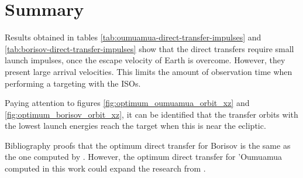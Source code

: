 \section{Summary}
\label{sec:direct-results}

Results obtained in tables \ref{tab:oumuamua-direct-transfer-impulses} and
\ref{tab:borisov-direct-transfer-impulses} show that the direct transfers
require small launch impulses, once the escape velocity of Earth is overcome.
However, they present large arrival velocities. This limits the amount of
observation time when performing a targeting with the ISOs.

Paying attention to figures \ref{fig:optimum_oumuamua_orbit_xz} and
\ref{fig:optimum_borisov_orbit_xz}, it can be identified that the transfer
orbits with the lowest launch energies reach the target when this is near the
ecliptic.

Bibliography proofs that the optimum direct transfer for Borisov is the same as
the one computed by \cite{hibberd2021}. However, the optimum direct transfer for
'Oumuamua computed in this work could expand the research from \cite{hein2018}.
